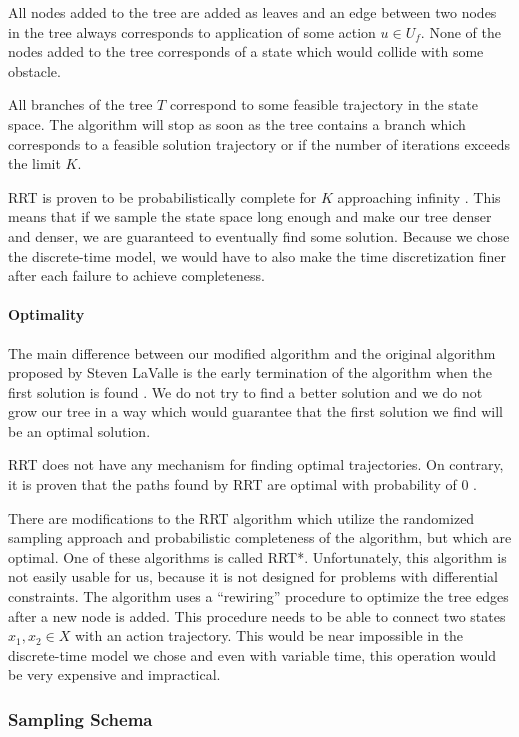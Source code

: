 All nodes added to the tree are added as leaves and an edge between two nodes in the tree always corresponds to application of some action $u\in U_f$. None of the nodes added to the tree corresponds of a state which would collide with some obstacle.

All branches of the tree $T$ correspond to some feasible trajectory in the state space. The algorithm will stop as soon as the tree contains a branch which corresponds to a feasible solution trajectory or if the number of iterations exceeds the limit $K$.

\gls*{RRT} is proven to be probabilistically complete for $K$ approaching infinity \cite{RRT_star}. This means that if we sample the state space long enough and make our tree denser and denser, we are guaranteed to eventually find some solution. Because we chose the discrete-time model, we would have to also make the time discretization finer after each failure to achieve completeness.

\paragraph{Optimality}

The main difference between our modified algorithm and the original algorithm proposed by Steven LaValle is the early termination of the algorithm when the first solution is found \cite{RRT}. We do not try to find a better solution and we do not grow our tree in a way which would guarantee that the first solution we find will be an optimal solution.

\gls*{RRT} does not have any mechanism for finding optimal trajectories. On contrary, it is proven that the paths found by \gls*{RRT} are optimal with probability of 0 \cite{RRT_star}.

There are modifications to the \gls*{RRT} algorithm which utilize the randomized sampling approach and probabilistic completeness of the algorithm, but which are optimal. One of these algorithms is called \gls{RRT*}. Unfortunately, this algorithm is not easily usable for us, because it is not designed for problems with differential constraints. The algorithm uses a ``rewiring'' procedure to optimize the tree edges after a new node is added. This procedure needs to be able to connect two states $x_1, x_2\in X$ with an action trajectory. This would be near impossible in the discrete-time model we chose and even with variable time, this operation would be very expensive and impractical.

\subsubsection{Sampling Schema}

